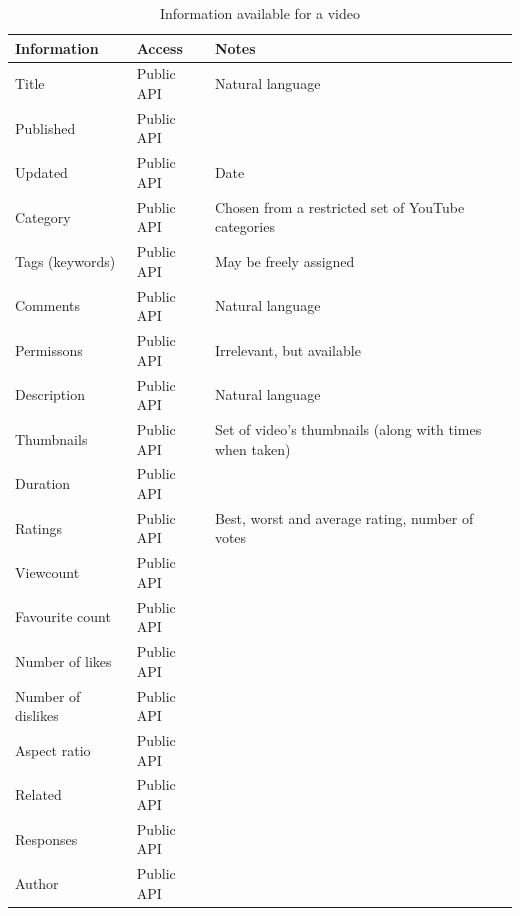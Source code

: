 \clearpage
\begin{table}[htb]
  \begin{center}
    \begin{tabular}{|p{3cm} | l | p{4cm}|} \hline
    Information & Access & Notes\\ \hline
    Title & Public API & Natural language \\
    Published & Public API & \\
    Updated & Public API & Date \\
    Category & Public API & Chosen from a restricted set of YouTube categories \\
    Tags (keywords) & Public API & May be freely assigned \\
    Comments & Public API & Natural language \\
    Permissons & Public API & Irrelevant, but available \\
    Description & Public API & Natural language \\
    Thumbnails & Public API & Set of video's thumbnails (along with times
    when taken) \\
    Duration & Public API & \\
    Ratings & Public API & Best, worst and average rating, number of votes \\
    Viewcount & Public API & \\
    Favourite count & Public API & \\
    Number of likes & Public API & \\
    Number of dislikes & Public API & \\
    Aspect ratio & Public API & \\
    Related & Public API & \\
    Responses & Public API & \\
    Author & Public API & \\ \hline
    \end{tabular}
    \caption{Information available for a video}
    \label{ut_video_info}
  \end{center}
\end{table}

